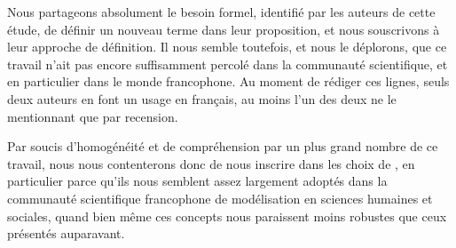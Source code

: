 Nous partageons absolument le besoin formel, identifié par les auteurs de cette étude, de définir un nouveau terme dans leur proposition, et nous souscrivons à leur approche de définition.
Il nous semble toutefois, et nous le déplorons, que ce travail n'ait pas encore suffisamment percolé dans la communauté scientifique, et en particulier dans le monde francophone.
Au moment de rédiger ces lignes, seuls deux auteurs en font un usage en français, au moins l'un des deux \autocite[89, 436]{rey-coyrehourcq_plateforme_2015} ne le mentionnant que par recension.

Par soucis d'homogénéité et de compréhension par un plus grand nombre de ce travail, nous nous contenterons donc de nous inscrire dans les choix de \textcite[voir \cref{enc:lexique-eval-amblard}]{amblard_evaluation_2006}, en particulier parce qu'ils nous semblent assez largement adoptés dans la communauté scientifique francophone de modélisation en sciences humaines et sociales, quand bien même ces concepts nous paraissent moins robustes que ceux présentés auparavant.

